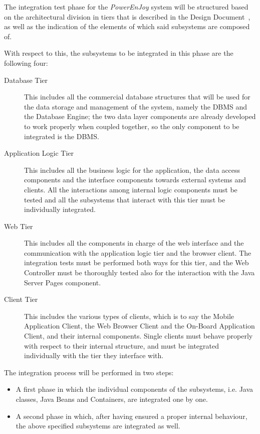 The integration test phase for the \emph{PowerEnJoy} system will be structured based on the architectural division in tiers that is described in the Design Document~\cite{dd}, as well as the indication of the elements of which said subsystems are composed of.

With respect to this, the subsystems to be integrated in this phase are the following four:
\begin{description}
\item[Database Tier] This includes all the commercial database structures that will be used for the data storage and management of the system, namely the DBMS and the Database Engine; the two data layer components are already developed to work properly when coupled together, so the only component to be integrated is the DBMS.
\item[Application Logic Tier] This includes all the business logic for the application, the data access components and the interface components towards external systems and clients. All the interactions among internal logic components must be tested and all the subsystems that interact with this tier must be individually integrated.
\item[Web Tier] This includes all the components in charge of the web interface and the communication with the application logic tier and the browser client. The integration tests must be performed both ways for this tier, and the Web Controller must be thoroughly tested also for the interaction with the Java Server Pages component.
\item[Client Tier] This includes the various types of clients, which is to say the Mobile Application Client, the Web Browser Client and the On-Board Application Client, and their internal components. Single clients must behave properly with respect to their internal structure, and must be integrated individually with the tier they interface with.
\end{description}

The integration process will be performed in two steps:
\begin{itemize}
\item A first phase in which the individual components of the subsystems, i.e. Java classes, Java Beans and Containers, are integrated one by one.
\item A second phase in which, after having ensured a proper internal behaviour, the above specified subsystems are integrated as well.
\end{itemize}

